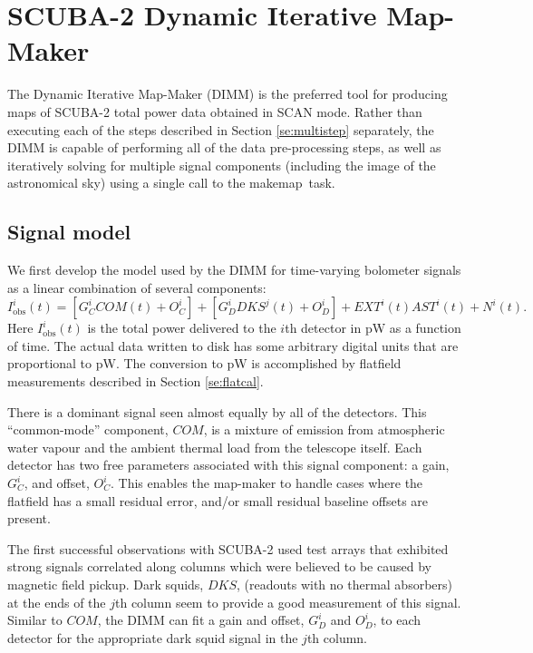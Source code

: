 \documentclass[twoside,11pt]{article}
\newcommand{\xref}[3]{#1}
\newcommand{\xlabel}[1]{}
\renewcommand{\_}{\texttt{\symbol{95}}}
\newcommand{\task}[1]{\textsf{#1}}
\newcommand{\makemap}{\xref{\task{makemap}}{sun258}{MAKEMAP}}
\begin{document}
\section{\xlabel{dimm}SCUBA-2 Dynamic Iterative Map-Maker\label{se:dimm}}

The Dynamic Iterative Map-Maker (DIMM) is the preferred tool for
producing maps of SCUBA-2 total power data obtained in SCAN
mode. Rather than executing each of the steps described in Section
\ref{se:multistep} separately, the DIMM is capable of performing all
of the data pre-processing steps, as well as iteratively solving for
multiple signal components (including the image of the astronomical
sky) using a single call to the \makemap\ task.

\subsection{Signal model}

We first develop the model used by the DIMM for time-varying bolometer
signals as a linear combination of several components:
%
\begin{equation}
I^i_{\mathrm{obs}}(t) = [G_C^i COM(t) + O_C^i] + [G_D^i DKS^j(t) + O_D^i] +
                      EXT^i(t) AST^i(t) + N^i(t).
\end{equation}
%
Here $I^i_{\mathrm{obs}}(t)$ is the total power delivered to the $i$th
detector in pW as a function of time. The actual data written to disk
has some arbitrary digital units that are proportional to pW. The
conversion to pW is accomplished by flatfield measurements described
in Section \ref{se:flatcal}.

There is a dominant signal seen almost equally by all of the
detectors. This ``common-mode'' component, $COM$, is a mixture of
emission from atmospheric water vapour and the ambient thermal load
from the telescope itself. Each detector has two free parameters
associated with this signal component: a gain, $G_C^i$, and offset,
$O_C^i$. This enables the map-maker to handle cases where the
flatfield has a small residual error, and/or small residual baseline
offsets are present.

The first successful observations with SCUBA-2 used test arrays that
exhibited strong signals correlated along columns which were believed
to be caused by magnetic field pickup. Dark squids, $DKS$, (readouts
with no thermal absorbers) at the ends of the $j$th column seem to
provide a good measurement of this signal. Similar to $COM$, the DIMM
can fit a gain and offset, $G_D^i$ and $O_D^i$, to each detector for
the appropriate dark squid signal in the $j$th column.
\end{document}
